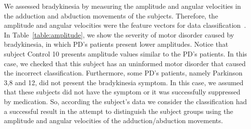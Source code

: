 \documentclass[10pt, conference, compsocconf]{IEEEtran}
\begin{document}
We assessed bradykinesia by measuring the amplitude and angular velocities in the adduction and abduction movements of the subjects. Therefore, the amplitude and angular velocities were the feature vectors for data classification~\cite{kantardzic2011data}. In Table~\ref{table:amplitude}, we show the severity of motor disorder caused by bradykinesia, in which PD's patients present lower amplitudes. Notice that subject Control 10 presents amplitude values similar to the PD's patients. In this case, we checked that this subject has an uninformed motor disorder that caused the incorrect classification. Furthermore, some PD's patients, namely Parkinson 3,8 and 12, did not present the bradykinesia symptom. In this case, we assumed that these subjects did not have the symptom or it was successfully suppressed by medication. So, according the subject's data we consider the classification had a successful result in the attempt to distinguish the subject groups using the amplitude and angular velocities of the adduction/abduction movements.
\end{document}
